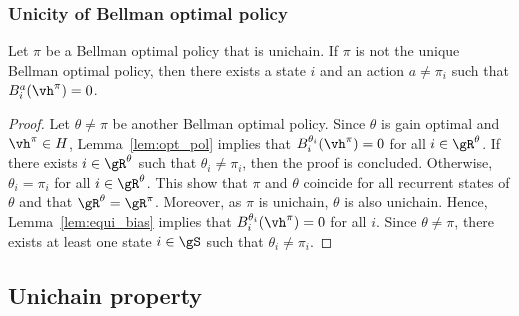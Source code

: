 \subsubsection{Unicity of Bellman optimal policy}
\label{ssec:unicity}

\begin{lem}
    \label{lem:unicity_BO}
    Let $\pi$ be a Bellman optimal policy that is unichain. If $\pi$ is not the unique Bellman optimal policy, then there exists a state $i$ and an action $a\neq\pi_i$ such that $B_i^a(\vh^\pi)=0$.
\end{lem}
\begin{proof}
    Let $\theta\neq\pi$ be another Bellman optimal policy. Since $\theta$ is gain optimal and $\vh^\pi\in H$, Lemma~\ref{lem:opt_pol} implies that $B_i^{\theta_i}(\vh^\pi) =0$ for all $i\in\gR^\theta$. If there exists $i\in\gR^\theta$ such that $\theta_i\neq\pi_i$, then the proof is concluded.  Otherwise, $\theta_i=\pi_i$ for all $i\in\gR^\theta$. This show that $\pi$ and $\theta$ coincide for all recurrent states of $\theta$ and that $\gR^\theta=\gR^\pi$. Moreover, as $\pi$ is unichain, $\theta$ is also unichain. Hence, Lemma~\ref{lem:equi_bias} implies that $B_i^{\theta_i}(\vh^\pi)=0$ for all $i$. Since $\theta\neq\pi$, there exists at least one state $i\in\gS$ such that $\theta_i\neq\pi_i$.
\end{proof}


\subsection{Unichain property}

